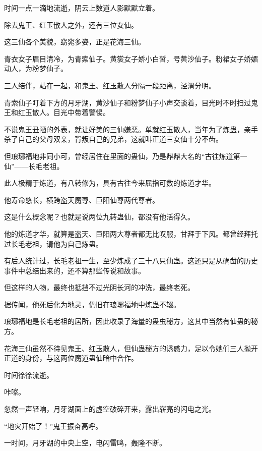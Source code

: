 
\begin{this_body}

时间一点一滴地流逝，阴云上数道人影默默立着。

除去鬼王、红玉散人之外，还有三位女仙。

这三仙各个美貌，窈窕多姿，正是花海三仙。

青衣女子眉目清冷，为青索仙子。黄裳女子娇小白皙，号黄沙仙子。粉裙女子娇媚动人，为粉梦仙子。

三人结伴，站在一起，和鬼王、红玉散人分隔一段距离，泾渭分明。

青索仙子盯着下方的月牙湖，黄沙仙子和粉梦仙子小声交谈着，目光时不时扫过鬼王和红玉散人。目光中带着警惕。

不说鬼王丑陋的外表，就让好美的三仙嫌恶。单就红玉散人，当年为了炼蛊，亲手杀了自己的父母双亲，背叛自己的兄弟，这就叫正道三女仙十分不齿。

但琅琊福地非同小可，曾经居住在里面的蛊仙，乃是鼎鼎大名的“古往炼道第一仙”——长毛老祖。

此人极精于炼道，有八转修为，具有古往今来屈指可数的炼道才华。

他寿命悠长，横跨盗天魔尊、巨阳仙尊两代尊者。

这是什么概念呢？也就是说两位九转蛊仙，都没有他活得久。

他的炼道才华，就算是盗天、巨阳两大尊者都无比叹服，甘拜于下风。都曾经拜托过长毛老祖，请他为自己炼蛊。

有后人统计过，长毛老祖一生，至少炼成了三十八只仙蛊。这还只是从确凿的历史事件中总结出来的，还不算那些传说和故事。

但这样的人物，最终也抵挡不过光阴长河的冲洗，最终老死。

据传闻，他死后化为地灵，仍旧在琅琊福地中炼蛊不辍。

琅琊福地是长毛老祖的居所，因此收录了海量的蛊虫秘方，这其中当然有仙蛊的秘方。

花海三仙虽然不待见鬼王、红玉散人，但仙蛊秘方的诱惑力，足以令她们三人抛开正道的身份，与这两位魔道蛊仙暗中合作。

时间徐徐流逝。

咔嚓。

忽然一声轻响，月牙湖面上的虚空破碎开来，露出崭亮的闪电之光。

“地灾开始了！”鬼王振奋高呼。

一时间，月牙湖的中央上空，电闪雷鸣，轰隆不断。


\end{this_body}
